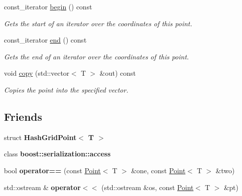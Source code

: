 \begin{DoxyCompactItemize}
const\-\_\-iterator \hyperlink{classrepast_1_1_point_aec55ad9f0415bfa707daf019328514ed}{begin} () const 
\begin{DoxyCompactList}\small\item\em Gets the start of an iterator over the coordinates of this point. \end{DoxyCompactList}\item 
const\-\_\-iterator \hyperlink{classrepast_1_1_point_a4859ae010bfd59c8c37283d8af58b160}{end} () const 
\begin{DoxyCompactList}\small\item\em Gets the end of an iterator over the coordinates of this point. \end{DoxyCompactList}\item 
void \hyperlink{classrepast_1_1_point_a6c7ba452e7c41d28216ed7a7abfb623a}{copy} (std\-::vector$<$ T $>$ \&out) const 
\begin{DoxyCompactList}\small\item\em Copies the point into the specified vector. \end{DoxyCompactList}\end{DoxyCompactItemize}
\subsection*{Friends}
\begin{DoxyCompactItemize}
\item 
\hypertarget{classrepast_1_1_point_a75395e59eeb036931f89fc247e44910e}{struct {\bfseries Hash\-Grid\-Point$<$ T $>$}}\label{classrepast_1_1_point_a75395e59eeb036931f89fc247e44910e}

\item 
\hypertarget{classrepast_1_1_point_ac98d07dd8f7b70e16ccb9a01abf56b9c}{class {\bfseries boost\-::serialization\-::access}}\label{classrepast_1_1_point_ac98d07dd8f7b70e16ccb9a01abf56b9c}

\item 
\hypertarget{classrepast_1_1_point_a2438176b2bab962e952bbeb309af3497}{bool {\bfseries operator==} (const \hyperlink{classrepast_1_1_point}{Point}$<$ T $>$ \&one, const \hyperlink{classrepast_1_1_point}{Point}$<$ T $>$ \&two)}\label{classrepast_1_1_point_a2438176b2bab962e952bbeb309af3497}

\item 
\hypertarget{classrepast_1_1_point_abf6f92c0466e14e91f78c562ea44cfef}{std\-::ostream \& {\bfseries operator$<$$<$} (std\-::ostream \&os, const \hyperlink{classrepast_1_1_point}{Point}$<$ T $>$ \&pt)}\label{classrepast_1_1_point_abf6f92c0466e14e91f78c562ea44cfef}

\end{DoxyCompactItemize}


